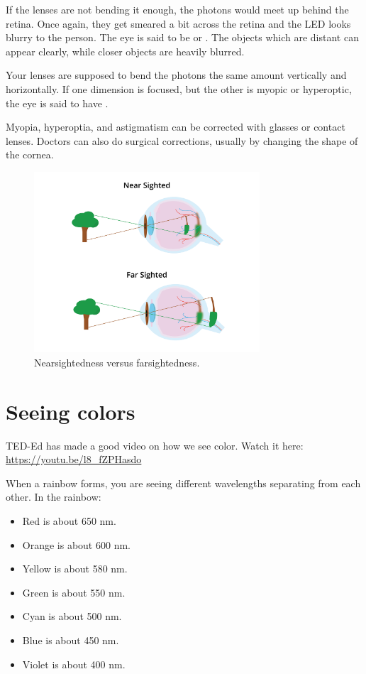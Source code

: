 If the lenses are not bending it enough, the photons would meet up
behind the retina. Once again, they get smeared a bit across the
retina and the LED looks blurry to the person. The eye is said to be
 or . The objects which are distant can appear clearly, while closer objects are heavily blurred. 

Your lenses are supposed to bend the photons the same amount
vertically and horizontally. If one dimension is focused, but the
other is myopic or hyperoptic, the eye is said to have .

Myopia, hyperoptia, and astigmatism can be corrected with glasses or contact
lenses. Doctors can also do surgical corrections, usually by changing
the shape of the cornea.
\begin{figure}[htbp]
    \centering
    \includegraphics[width=0.75\textwidth]{nearfarSight.png}
    \caption{Nearsightedness versus farsightedness.}
    \label{fig:nearfarSight}
\end{figure}

\section{Seeing colors}
TED-Ed has made a good video on how we see color. Watch it here: \url{https://youtu.be/l8_fZPHasdo}

When a rainbow forms, you are seeing different wavelengths separating from each other. In the rainbow:
\begin{itemize}
\item Red is about 650 nm.
\item Orange is about 600 nm.
\item Yellow is about 580 nm.
\item Green is about 550 nm.
\item Cyan is about 500 nm.
\item Blue is about 450 nm.
\item Violet is about 400 nm.
\end{itemize}

